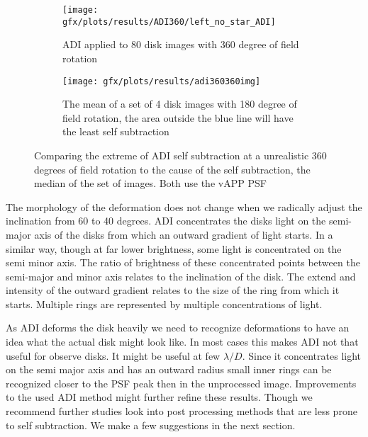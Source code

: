 \begin{figure}[h!]
      \begin{subfigure}[t]{0.5\textwidth}
        \texttt{[image: gfx/plots/results/ADI360/left\_no\_star\_ADI]}
        \caption{ADI applied to 80 disk images with 360 degree of field rotation}
      \end{subfigure}
      \begin{subfigure}[t]{0.5 \textwidth}
        \texttt{[image: gfx/plots/results/adi360360img]}
        \caption{The mean of a set of 4 disk images with 180 degree of field rotation, the area outside the blue line will have the least self subtraction}
        \label{fig:adi_why_doomed_b}
      \end{subfigure}%
           
  \caption{Comparing the extreme of \ac{ADI} self subtraction at a unrealistic 360 degrees of field rotation to the cause of the self subtraction, the median of the set of images. Both use the \ac{vAPP} \ac{PSF}}
  \label{fig:adi_why_doomed}
\end{figure}

The morphology of the deformation does not change when we radically adjust the inclination from 60 to 40 degrees. \ac{ADI} concentrates the disks light on the semi-major axis of the disks from which an outward gradient of light starts. In a similar way, though at far lower brightness, some light is concentrated on the semi minor axis. The ratio of brightness of these concentrated points between the semi-major and minor axis relates to the inclination of the disk. The extend and intensity of the outward gradient relates to the size of the ring from which it starts. Multiple rings are represented by multiple concentrations of light.

As \ac{ADI} deforms the disk heavily we need to recognize deformations to have an idea what the actual disk might look like. In most cases this makes \ac{ADI} not that useful for observe disks. It might be useful at few $\lambda/D$. Since it concentrates light on the semi major axis and has an outward radius small inner rings can be recognized closer to the \ac{PSF} peak then in the unprocessed image. Improvements to the used \ac{ADI} method might further refine these results. Though we recommend further studies look into post processing methods that are less prone to self subtraction. We make a few suggestions in the next section.
